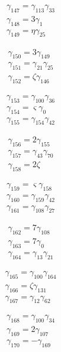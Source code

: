 \[\begin{aligned}\gamma_{147}=\gamma_{113} \gamma_{33}\\ \gamma_{148}=3 \gamma_{1}\\ \gamma_{149}=\eta  \gamma_{25}\end{aligned}\]

\[\begin{aligned}\gamma_{150}=3 \gamma_{149}\\ \gamma_{151}=\gamma_{21} \gamma_{25}\\ \gamma_{152}=\zeta  \gamma_{146}\end{aligned}\]

\[\begin{aligned}\gamma_{153}=\gamma_{100} \gamma_{36}\\ \gamma_{154}=\varsigma  \gamma_{0}\\ \gamma_{155}=\gamma_{154} \gamma_{42}\end{aligned}\]

\[\begin{aligned}\gamma_{156}=2 \gamma_{155}\\ \gamma_{157}=\gamma_{43} \gamma_{70}\\ \gamma_{158}=2 \zeta \end{aligned}\]

\[\begin{aligned}\gamma_{159}=\varsigma  \gamma_{158}\\ \gamma_{160}=\gamma_{159} \gamma_{42}\\ \gamma_{161}=\gamma_{108} \gamma_{27}\end{aligned}\]

\[\begin{aligned}\gamma_{162}=7 \gamma_{108}\\ \gamma_{163}=7 \gamma_{0}\\ \gamma_{164}=\gamma_{13} \gamma_{21}\end{aligned}\]

\[\begin{aligned}\gamma_{165}=\gamma_{100} \gamma_{164}\\ \gamma_{166}=\zeta  \gamma_{131}\\ \gamma_{167}=\gamma_{12} \gamma_{62}\end{aligned}\]

\[\begin{aligned}\gamma_{168}=\gamma_{100} \gamma_{34}\\ \gamma_{169}=2 \gamma_{107}\\ \gamma_{170}=- \gamma_{169}\end{aligned}\]

